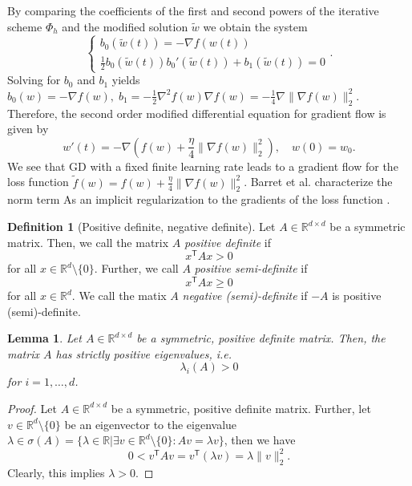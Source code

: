 \documentclass[12pt]{article}
\newtheorem{lemma}[lemma]{Lemma}
\theoremstyle{definition}
\newtheorem{definition}[definition]{Definition}
\numberwithin{equation}{section}
\newcommand{\R}{\mathbb{R}}
\newcommand{\T}{\mathsf{T}}
\newcommand{\norm}[1]{\lVert{#1}\rVert_2}
\begin{document}
By comparing the coefficients of the first and second powers of the iterative scheme $\Phi_h$ and the modified solution $\widetilde{w}$ we obtain the system
\begin{equation*}
  \begin{cases}
    b_0(\widetilde{w}(t)) = - \nabla f(w(t)) \\
    \frac{1}{2}b_0(\widetilde{w}(t))b_0'(\widetilde{w}(t)) + b_1(\widetilde{w}(t)) = 0
  \end{cases}.
\end{equation*}
Solving for $b_0$ and $b_1$ yields $b_0(w) = -\nabla f(w), \; b_1 = - \frac{1}{2}\nabla^2f(w)\nabla f(w) = -\frac{1}{4}\nabla\norm{\nabla f(w)}^2$. Therefore, the second order modified differential equation for gradient flow is given by
\begin{equation}
  \label{eq:second_order_ode}
  w'(t) = -\nabla\left(f(w) + \frac{\eta}{4}\norm{\nabla f(w)}^2\right),\quad w(0) = w_0.
\end{equation}
We see that GD with a fixed finite learning rate leads to a gradient flow for the loss function $\widetilde{f}(w) = f(w) + \frac{\eta}{4}\norm{\nabla f(w)}^2$. Barret et al. characterize the norm term As an implicit regularization to the gradients of the loss function \cite{barrettImplicitGradientRegularization2021}.
\begin{definition}[Positive definite, negative definite]
  Let $A \in \R^{d \times d}$ be a symmetric matrix. Then, we call the matrix $A$ \emph{positive definite} if
  \begin{equation*}
    x^\T A x > 0
  \end{equation*}
  for all $x \in \R^d \setminus \{0\}$. Further, we call $A$ \emph{positive semi-definite} if
  \begin{equation*}
    x^\T A x \geq 0
  \end{equation*}
  for all $x \in \R^d$. We call the matix $A$ \emph{negative (semi)-definite} if $-A$ is positive (semi)-definite.
\end{definition}
\begin{lemma}
  Let $A \in \R^{d \times d}$ be a symmetric, positive definite matrix. Then, the matrix $A$ has strictly positive eigenvalues, i.e.
  \begin{equation*}
    \lambda_i(A) > 0
  \end{equation*}
  for $i = 1, \dots, d$.
\end{lemma}
\begin{proof}
  Let $A \in \R^{d \times d}$ be a symmetric, positive definite matrix. Further, let $v \in \R^d \setminus \{0\}$ be an eigenvector to the eigenvalue $\lambda \in \sigma(A) = \{\lambda \in \R | \exists v \in \R^d \setminus \{0\}: Av = \lambda v \}$, then we have
  \begin{equation*}
    0 < v^\T A v = v^\T (\lambda v) = \lambda \norm{v}^2.
  \end{equation*}
  Clearly, this implies $\lambda > 0$.
\end{proof}
\end{document}
